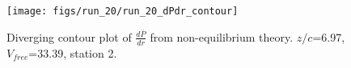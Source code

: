 \begin{figure}[H]
\centering
\texttt{[image: figs/run\_20/run\_20\_dPdr\_contour]}
\caption{Diverging contour plot of $\frac{d\bar{P}}{dr}$ from non-equilibrium theory. $z/c$=6.97, $V_{free}$=33.39, station 2.}
\label{fig:run_20_dPdr_contour}
\end{figure}


